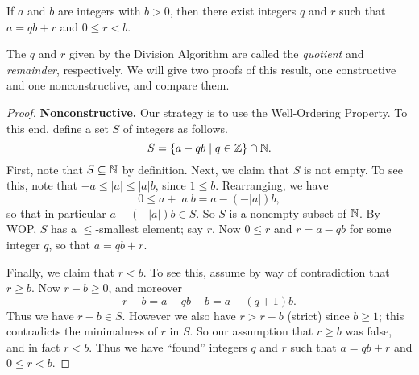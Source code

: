 \begin{thm}
If \(a\) and \(b\) are integers with \(b > 0\), then there exist integers \(q\) and \(r\) such that \(a = qb + r\) and \(0 \leq r < b\).
\end{thm}

The \(q\) and \(r\) given by the Division Algorithm are called the \emph{quotient} and \emph{remainder}, respectively.
We will give two proofs of this result, one constructive and one nonconstructive, and compare them.

\begin{proof}
\textbf{Nonconstructive.}
Our strategy is to use the Well-Ordering Property.
To this end, define a set \(S\) of integers as follows.
\[ S = \{ a - qb \mid q \in \mathbb{Z} \} \cap \mathbb{N}. \]
First, note that \(S \subseteq \mathbb{N}\) by definition.
Next, we claim that \(S\) is not empty.
To see this, note that \(-a \leq |a| \leq |a|b\), since \(1 \leq b\).
Rearranging, we have \[ 0 \leq a + |a|b = a - (-|a|)b, \] so that in particular \(a - (-|a|)b \in S\).
So \(S\) is a nonempty subset of \(\mathbb{N}\).
By WOP, \(S\) has a \(\leq\)-smallest element; say \(r\).
Now \(0 \leq r\) and \(r = a - qb\) for some integer \(q\), so that \(a = qb + r\).

Finally, we claim that \(r < b\).
To see this, assume by way of contradiction that \(r \geq b\).
Now \(r-b \geq 0\), and moreover \[ r-b = a - qb - b = a - (q+1)b. \]
Thus we have \(r-b \in S\).
However we also have \(r > r-b\) (strict) since \(b \geq 1\); this contradicts the minimalness of \(r\) in \(S\).
So our assumption that \(r \geq b\) was false, and in fact \(r < b\).
Thus we have ``found'' integers \(q\) and \(r\) such that \(a = qb + r\) and \(0 \leq r < b\).
\end{proof}

